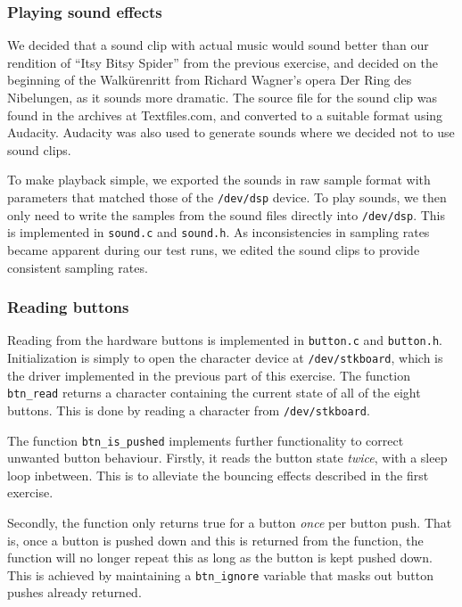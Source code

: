 \subsubsection{Playing sound effects}

We decided that a sound clip with actual music would sound better than
our rendition of ``Itsy Bitsy Spider'' from the previous exercise, and
decided on the beginning of the Walkürenritt from Richard Wagner's
opera Der Ring des Nibelungen, as it sounds more dramatic. The source
file for the sound clip was found in the archives at Textfiles.com, and
converted to a suitable format using Audacity. Audacity was also used to
generate sounds where we decided not to use sound clips.

To make playback simple, we exported the sounds in raw sample format
with parameters that matched those of the \texttt{/dev/dsp} device. To
play sounds, we then only need to write the samples from the sound files
directly into \texttt{/dev/dsp}. This is implemented in \texttt{sound.c}
and \texttt{sound.h}. As inconsistencies in sampling rates became apparent during our test runs, we edited the sound clips to provide consistent sampling rates.

\subsubsection{Reading buttons}

Reading from the hardware buttons is implemented in \texttt{button.c}
and \texttt{button.h}. Initialization is simply to open the character
device at \texttt{/dev/stkboard}, which is the driver implemented in the
previous part of this exercise. The function \texttt{btn\_read} returns
a character containing the current state of all of the eight buttons.
This is done by reading a character from \texttt{/dev/stkboard}.

The function \texttt{btn\_is\_pushed} implements further functionality to
correct unwanted button behaviour. Firstly, it reads the button state
\emph{twice}, with a sleep loop inbetween. This is to alleviate the
bouncing effects described in the first exercise.

Secondly, the function only returns true for a button \emph{once} per
button push. That is, once a button is pushed down and this is returned
from the function, the function will no longer repeat this as long as
the button is kept pushed down. This is achieved by maintaining a
\texttt{btn\_ignore} variable that masks out button pushes already
returned.

